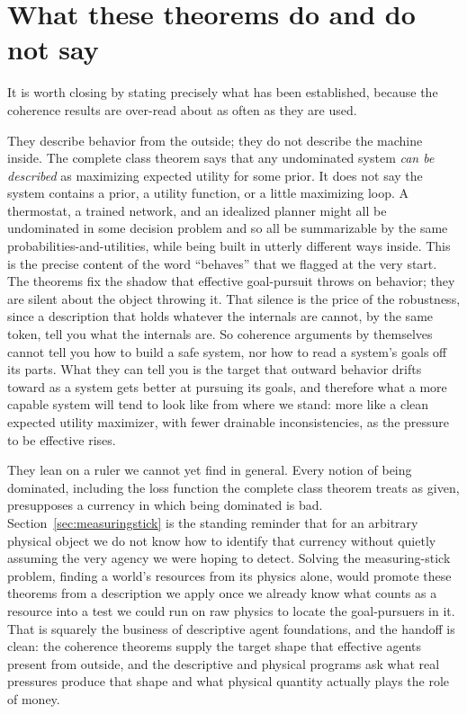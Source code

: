 \documentclass[10pt]{article}
\theoremstyle{definition}
\theoremstyle{remark}
\begin{document}
\section{What these theorems do and do not say}
\label{sec:scope}

It is worth closing by stating precisely what has been established, because the coherence results are over-read about as often as they are used.

They describe behavior from the outside; they do not describe the machine inside. The complete class theorem says that any undominated system \emph{can be described} as maximizing expected utility for some prior. It does not say the system contains a prior, a utility function, or a little maximizing loop. A thermostat, a trained network, and an idealized planner might all be undominated in some decision problem and so all be summarizable by the same probabilities-and-utilities, while being built in utterly different ways inside. This is the precise content of the word ``behaves'' that we flagged at the very start. The theorems fix the shadow that effective goal-pursuit throws on behavior; they are silent about the object throwing it. That silence is the price of the robustness, since a description that holds whatever the internals are cannot, by the same token, tell you what the internals are. So coherence arguments by themselves cannot tell you how to build a safe system, nor how to read a system's goals off its parts. What they can tell you is the target that outward behavior drifts toward as a system gets better at pursuing its goals, and therefore what a more capable system will tend to look like from where we stand: more like a clean expected utility maximizer, with fewer drainable inconsistencies, as the pressure to be effective rises.

They lean on a ruler we cannot yet find in general. Every notion of being dominated, including the loss function the complete class theorem treats as given, presupposes a currency in which being dominated is bad. Section~\ref{sec:measuringstick} is the standing reminder that for an arbitrary physical object we do not know how to identify that currency without quietly assuming the very agency we were hoping to detect. Solving the measuring-stick problem, finding a world's resources from its physics alone, would promote these theorems from a description we apply once we already know what counts as a resource into a test we could run on raw physics to locate the goal-pursuers in it. That is squarely the business of descriptive agent foundations, and the handoff is clean: the coherence theorems supply the target shape that effective agents present from outside, and the descriptive and physical programs ask what real pressures produce that shape and what physical quantity actually plays the role of money.
\end{document}
